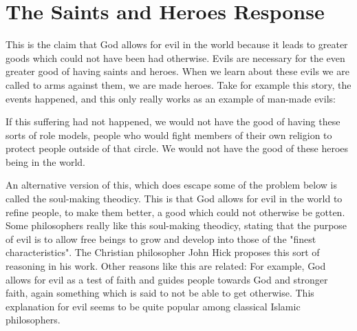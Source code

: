 \section{The Saints and Heroes Response}
This is the claim that God allows for evil in the world because it leads to greater goods which could not have been had otherwise. Evils are necessary for the even greater good of having saints and heroes. When we learn about these evils we are called to arms against them, we are made heroes. Take for example this story, the events happened, and this only really works as an example of man-made evils:


If this suffering had not happened, we would not have the good of having these sorts of role models, people who would fight members of their own religion to protect people outside of that circle. We would not have the good of these heroes being in the world.

An alternative version of this, which does escape some of the problem below is called the soul-making theodicy. This is that God allows for evil in the world to refine people, to make them better, a good which could not otherwise be gotten. Some philosophers really like this soul-making theodicy, stating that the purpose of evil is to allow free beings to grow and develop into those of the "finest characteristics". The Christian philosopher John Hick proposes this sort of reasoning in his work.\autocite{Hick1} Other reasons like this are related: For example, God allows for evil as a test of faith and guides people towards God and stronger faith, again something which is said to not be able to get otherwise. This explanation for evil seems to be quite popular among classical Islamic philosophers.\autocite{Rouzati1}

